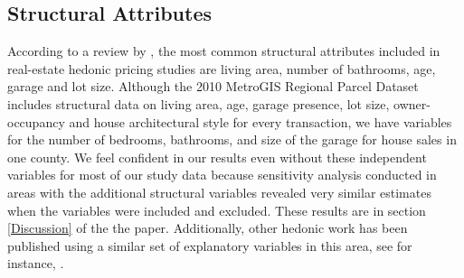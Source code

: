 \documentclass{article}\usepackage{graphicx, color}
\begin{document}
\begin{table}
\caption{Matrix of Pearson Correlation Coefficients for Quantitative Variables}\label{tab:cor}
\begin{center}
\small
\tabcolsep=0.05cm
\end{center} 
\end{table}


\subsection{Structural Attributes}
According to a review by \cite{Wilhelmsson2000}, the most common structural attributes included in real-estate hedonic pricing studies are living area, number of bathrooms, age, garage and lot size.  Although the 2010 MetroGIS Regional Parcel Dataset includes structural data on living area, age, garage presence, lot size, owner-occupancy and house architectural style for every transaction, we have variables for the number of bedrooms, bathrooms, and size of the garage for house sales in one county. We feel confident in our results even without these independent variables for most of our study data because sensitivity analysis conducted in areas with the additional structural variables revealed very similar estimates when the variables were included and excluded. These results are in section \ref{Discussion} of the the paper. Additionally, other hedonic work has been published using a similar set of explanatory variables in this area, see for instance, \citet{Sander2009b}.
\end{document}

